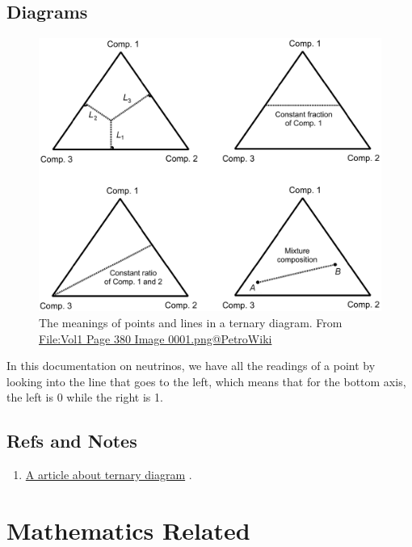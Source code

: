 \documentclass[letterpaper,12pt,english]{sphinxmanual}
\begin{document}
\section{Diagrams}
\label{commonsense:diagrams}\begin{figure}[htbp]
\centering
\capstart

\includegraphics{understandingTernaryDiagram.png}
\caption{The meanings of points and lines in a ternary diagram. From \href{http://petrowiki.org/File\%3AVol1\_Page\_380\_Image\_0001.png}{File:Vol1 Page 380 Image 0001.png@PetroWiki}}\end{figure}

In this documentation on neutrinos, we have all the readings of a point by looking into the line that goes to the left, which means that for the bottom axis, the left is 0 while the right is 1.


\section{Refs and Notes}
\label{commonsense:refs-and-notes}\begin{enumerate}
\item {} 
\href{http://petrowiki.org/Ternary\_phase\_diagrams}{A article about ternary diagram} .

\end{enumerate}


\chapter{Mathematics Related}
\label{math::doc}\label{math:mathematics-related}
\end{document}
